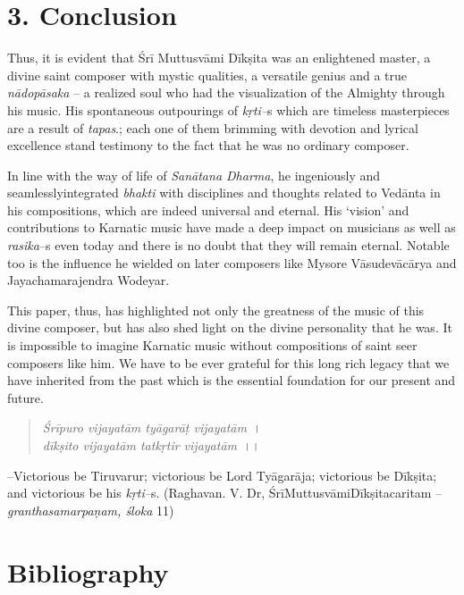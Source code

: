 \section*{3. Conclusion}

Thus, it is evident that Śrī Muttusvāmi Dīkṣita was an enlightened master, a divine saint composer with mystic qualities, a versatile genius and a true \textit{nādopāsaka} – a realized soul who had the visualization of the Almighty through his music. His spontaneous outpourings of \textit{kṛti–}s which are timeless masterpieces are a result of \textit{tapas}.; each one of them brimming with devotion and lyrical excellence stand testimony to the fact that he was no ordinary composer.

In line with the way of life of \textit{Sanātana Dharma}, he ingeniously and seamlesslyintegrated \textit{bhakti} with disciplines and thoughts related to Vedānta in his compositions, which are indeed universal and eternal. His ‘vision’ and contributions to Karnatic music have made a deep impact on musicians as well as \textit{rasika}–s even today and there is no doubt that they will remain eternal. Notable too is the influence he wielded on later composers like Mysore Vāsudevācārya and Jayachamarajendra Wodeyar.

This paper, thus, has highlighted not only the greatness of the music of this divine composer, but has also shed light on the divine personality that he was. It is impossible to imagine Karnatic music without compositions of saint seer composers like him. We have to be ever grateful for this long rich legacy that we have inherited from the past which is the essential foundation for our present and future.

\begin{verse}
\textit{Śrīpuro vijayatām tyāgarāṭ vijayatām}~।\\\textit{dīkṣito vijayatām tatkṛtir vijayatām}~।।
\end{verse}

–Victorious be Tiruvarur; victorious be Lord Tyāgarāja; victorious be Dīkṣita; and victorious be his \textit{kṛti–}s. (Raghavan. V. Dr, ŚrīMuttusvāmiDīkṣitacaritam – \textit{granthasamarpaṇam, śloka} 11)


\section*{Bibliography}


